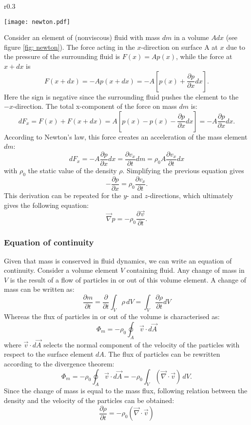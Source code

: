 \begin{wrapfigure}{r}{0.3\textwidth}
	\vspace{-60pt}
  \begin{center}
    \texttt{[image: newton.pdf]}
  \end{center}
   \vspace{-20pt}
  \caption{}\label{fig: newton}
  \vspace{-20pt}
\end{wrapfigure}

Consider an element of (nonviscous) fluid with mass $dm$ in a volume $A dx$ (see figure \ref{fig: newton}). The force acting in the $x$-direction on surface A at $x$ due to the pressure of the surrounding fluid  is $F(x) = A p(x) $, while the force at $x +dx$ is 
\[
F(x+dx) = - A p(x+dx) = -A [p(x) + \frac{\partial p}{\partial x} dx].
\]
Here the sign is negative since the surrounding fluid pushes the element to the $-x$-direction.
The total x-component of the force on mass $dm$ is:
\[
dF_x = F(x) + F(x+dx) = A [p(x) - p(x) - \frac{\partial p}{\partial x} dx] = - A \frac{\partial p}{\partial x} dx.
\]  
According to Newton's law, this force creates an acceleration of the mass element $dm$:
\[
dF_x = - A \frac{\partial p}{\partial x} dx = \frac{\partial v_x}{\partial t} dm = \rho_0 A \frac{\partial v_x}{\partial t} dx
\]
with $\rho_0$ the static value of the density $\rho$. Simplifying the previous equation gives
\[
- \frac{\partial p}{\partial x} = \rho_0 \frac{\partial v_x}{\partial t}.
\]
This derivation can be repeated for the $y$- and $z$-directions, which ultimately gives the following equation:
\begin{equation}
\vec{\nabla} p = - \rho_0 \frac{\partial \vec{v}}{\partial t}.
\label{newt}
\end{equation}


\subsubsection*{Equation of continuity}
Given that mass is conserved in fluid dynamics, we can write an equation of continuity. Consider a volume element $V$ containing fluid. Any change of mass in $V$ is the result of a flow of particles in or out of this volume element. A change of mass can be written as:
\[
\frac{\partial m}{\partial t} = \frac{\partial }{\partial t} \int_{V} \rho \,dV =\int_{V} \frac{\partial \rho}{\partial t} dV
\]
Whereas the flux of particles in or out of the volume is characterised as:
\[
\Phi_m = - \rho_0 \oint_A \vec{v} \cdot d\vec{A}
\]
where $\vec{v} \cdot d\vec{A}$ selects the normal component of the velocity of the particles with respect to the surface element $dA$.
The flux of particles can be rewritten according to the divergence theorem:
\[
\Phi_m = - \rho_0 \oint_A \vec{v} \cdot d\vec{A} =- \rho_0 \int_{V} (\vec{\nabla} \cdot \vec{v}) \, dV.
\]
Since the change of mass is equal to the mass flux, following relation between the density and the velocity of the particles can be obtained:
\begin{equation}
\frac{\partial \rho}{\partial t}  = - \rho_0 (\vec{\nabla} \cdot \vec{v})
\label{cont}
\end{equation}


